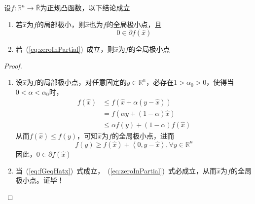 \begin{theorem}
    设$f:\mathbb{R}^n\to \bar{\mathbb{R}}$为正规凸函数，以下结论成立
    \begin{enumerate}[label=(\roman*)]
        \item 若$\hat{x}$为$f$的局部极小，则$\hat{x}$也为$f$的全局极小点，且
        \begin{equation}\label{eq:zeroInPartial}
            0\in \partial f(\hat{x})
        \end{equation}
        \item 若~(\ref{eq:zeroInPartial})~成立，则$\hat{x}$为$f$的全局极小点
    \end{enumerate}
\end{theorem}
\begin{proof}
    \begin{enumerate}[label=(\roman*)]
        \item 设$\hat{x}$为$f$的局部极小点，对任意固定的$y\in\mathbb{R}^n$，必存在$1>\alpha_0>0$，使得当$0<\alpha<\alpha_0$时，
        \[
            \begin{array}{ll}
                f(\hat{x}) & \leq f(\hat{x} + \alpha(y-\hat{x}))\\
                & = f(\alpha y+(1-\alpha)\hat{x})\\
                & \leq \alpha f(y) + (1-\alpha)f(\hat{x})
            \end{array}
        \]
        从而$f(\hat{x})\leq f(y)$，可知$\hat{x}$为$f$的全局极小点，进而
        \begin{equation}\label{eq:fGeqHatx}
            f(y)\geq f(\hat{x}) + \left\langle 0,y-\hat{x} \right\rangle,\forall y \in\mathbb{R}^n
        \end{equation}
        因此，$0\in\partial f(\hat{x})$
        \item 当~(\ref{eq:fGeqHatx})~式成立，~(\ref{eq:zeroInPartial})~式必成立，从而$\hat{x}$为$f$的全局极小点。证毕！
    \end{enumerate}
\end{proof}